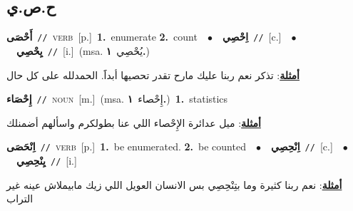 \documentclass[10pt,a4paper,twoside]{article} %
\begin{document}
\begin{multicols}{2}
\vspace{-3mm}
\subsection*{\color{blue}\foreignlanguage{arabic}{ح.ص.ي}\color{blue}{}} 

{\setlength\topsep{0pt}\textbf{\foreignlanguage{arabic}{أَحْصَى}}\ {\color{gray}\texttt{//}\color{black}}\ \textsc{verb}\ [p.]\ \textbf{1.}~enumerate  \textbf{2.}~count\ \ $\bullet$\ \ \setlength\topsep{0pt}\textbf{\foreignlanguage{arabic}{اِحْصِي}}\ {\color{gray}\texttt{//}\color{black}}\ [c.]\ \ $\bullet$\ \ \setlength\topsep{0pt}\textbf{\foreignlanguage{arabic}{يِحْصِي}}\ {\color{gray}\texttt{//}\color{black}}\ [i.]\ \color{gray}(msa. \foreignlanguage{arabic}{يُحْصِي}~\foreignlanguage{arabic}{\textbf{١.}})\color{black}\  \begin{flushright}\color{gray}\foreignlanguage{arabic}{\textbf{\underline{\foreignlanguage{arabic}{أمثلة}}}: تذكر نعم ربنا عليك مارح تقدر تحصيها أبداََ. الحمدلله على كل حال}\end{flushright}\color{black}} \vspace{2mm}

{\setlength\topsep{0pt}\textbf{\foreignlanguage{arabic}{إِحْصَاء}}\ {\color{gray}\texttt{//}\color{black}}\ \textsc{noun}\ [m.]\ \color{gray}(msa. \foreignlanguage{arabic}{إِحْصاء}~\foreignlanguage{arabic}{\textbf{١.}})\color{black}\ \textbf{1.}~statistics\  \begin{flushright}\color{gray}\foreignlanguage{arabic}{\textbf{\underline{\foreignlanguage{arabic}{أمثلة}}}: ميل عدائرة الإِحْصاء اللي عنا بطولكرم واسألهم أضمنلك}\end{flushright}\color{black}} \vspace{2mm}

{\setlength\topsep{0pt}\textbf{\foreignlanguage{arabic}{اِنْحَصَى}}\ {\color{gray}\texttt{//}\color{black}}\ \textsc{verb}\ [p.]\ \textbf{1.}~be enumerated.  \textbf{2.}~be counted\ \ $\bullet$\ \ \setlength\topsep{0pt}\textbf{\foreignlanguage{arabic}{اِنْحِصِي}}\ {\color{gray}\texttt{//}\color{black}}\ [c.]\ \ $\bullet$\ \ \setlength\topsep{0pt}\textbf{\foreignlanguage{arabic}{يِنْحِصِي}}\ {\color{gray}\texttt{//}\color{black}}\ [i.]\  \begin{flushright}\color{gray}\foreignlanguage{arabic}{\textbf{\underline{\foreignlanguage{arabic}{أمثلة}}}: نعم ربنا كثيرة وما بتِنْحِصِي بس الانسان العويل اللي زيك مابيملاش عينه غير التراب}\end{flushright}\color{black}} \vspace{2mm}


\end{multicols}
\end{document}
